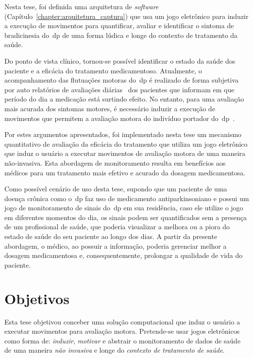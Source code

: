 Nesta tese, foi definida uma arquitetura de \textit{software} (Capítulo~\ref{chapter:arquitetura_captura}) que usa um jogo eletrônico para induzir a execução de movimentos para quantificar, avaliar e identificar o sintoma de bradicinesia do~\ac{dp} de uma forma lúdica e longe do contexto de tratamento da saúde.

Do ponto de vista clínico, tornou-se possível identificar o estado da saúde dos paciente e a eficácia do tratamento medicamentoso. Atualmente, o acompanhamento das flutuações motoras do~\ac{dp} é realizado de forma subjetiva por auto relatórios de avaliações diárias~\cite{parkself2015,reviewassesenspark2015} dos pacientes que informam em que período do dia a medicação está surtindo efeito. No entanto, para uma avaliação mais acurada dos sintomas motores, é necessário induzir a execução de movimentos que permitem a avaliação motora do indivíduo portador do~\ac{dp}~\cite{wiiassesspark2016}.

Por estes argumentos apresentados, foi implementado nesta tese um mecanismo quantitativo de avaliação da eficácia do tratamento que utiliza um jogo eletrônico que induz o usuário a executar movimentos de avaliação motora de uma maneira não-invasiva. Esta abordagem de monitoramento resulta em benefícios aos médicos para um tratamento mais efetivo e acurado da dosagem medicamentosa. 

Como possível cenário de uso desta tese, supondo que um paciente de uma doença crônica como o~\ac{dp} faz uso de medicamento antiparkinsoniano e possui um jogo de monitoramento de sinais do~\ac{dp} em sua residência, caso ele utilize o jogo em diferentes momentos do dia, os sinais podem ser quantificados sem a presença de um profissional de saúde, que poderia visualizar a melhora ou a piora do estado de saúde do seu paciente ao longo dos dias. A partir da presente abordagem, o médico, ao possuir a informação, poderia gerenciar melhor a dosagem medicamentosa e, consequentemente, prolongar a qualidade de vida do paciente.

\section{Objetivos}\label{section:objetivos}
Esta tese objetivou conceber uma solução computacional que induz o usuário a executar movimentos para avaliação motora. Pretende-se usar jogos eletrônicos como forma de: \textit{induzir}, \textit{motivar} e abstrair o monitoramento de dados de saúde de uma maneira \textit{não invasiva} e longe do \textit{contexto de tratamento de saúde}.

